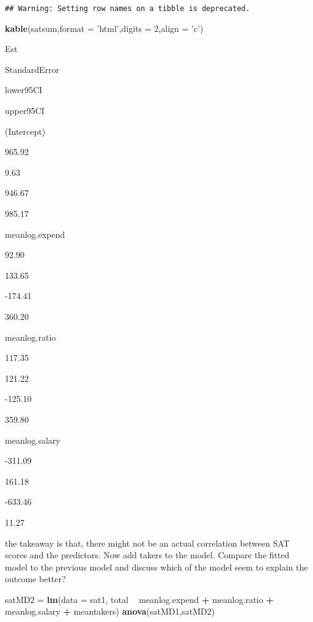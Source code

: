 \documentclass[]{article}
\newenvironment{Shaded}{\begin{snugshade}}{\end{snugshade}}
\newcommand{\DataTypeTok}[1]{\textcolor[rgb]{0.13,0.29,0.53}{#1}}
\newcommand{\DecValTok}[1]{\textcolor[rgb]{0.00,0.00,0.81}{#1}}
\newcommand{\KeywordTok}[1]{\textcolor[rgb]{0.13,0.29,0.53}{\textbf{#1}}}
\newcommand{\NormalTok}[1]{#1}
\newcommand{\OperatorTok}[1]{\textcolor[rgb]{0.81,0.36,0.00}{\textbf{#1}}}
\newcommand{\StringTok}[1]{\textcolor[rgb]{0.31,0.60,0.02}{#1}}
\begin{document}
\begin{verbatim}
## Warning: Setting row names on a tibble is deprecated.
\end{verbatim}

\begin{Shaded}
\begin{Highlighting}[]
\KeywordTok{kable}\NormalTok{(satsum,}\DataTypeTok{format =} \StringTok{'html'}\NormalTok{,}\DataTypeTok{digits =} \DecValTok{2}\NormalTok{,}\DataTypeTok{align =} \StringTok{'c'}\NormalTok{)}
\end{Highlighting}
\end{Shaded}

Est

StandardError

lower95CI

upper95CI

(Intercept)

965.92

9.63

946.67

985.17

meanlog.expend

92.90

133.65

-174.41

360.20

meanlog.ratio

117.35

121.22

-125.10

359.80

meanlog.salary

-311.09

161.18

-633.46

11.27

the takeaway is that, there might not be an actual correlation between
SAT scores and the predictors. Now add takers to the model.
Compare the fitted model to the previous model and discuss which of the
model seem to explain the outcome better?

\begin{Shaded}
\begin{Highlighting}[]
\NormalTok{satMD2 =}\StringTok{ }\KeywordTok{lm}\NormalTok{(}\DataTypeTok{data =}\NormalTok{ sat1, total }\OperatorTok{~}\StringTok{ }\NormalTok{meanlog.expend }\OperatorTok{+}\StringTok{ }\NormalTok{meanlog.ratio }\OperatorTok{+}\StringTok{ }\NormalTok{meanlog.salary }\OperatorTok{+}\StringTok{ }\NormalTok{meantakers)}
\KeywordTok{anova}\NormalTok{(satMD1,satMD2)}
\end{Highlighting}
\end{Shaded}
\end{document}
